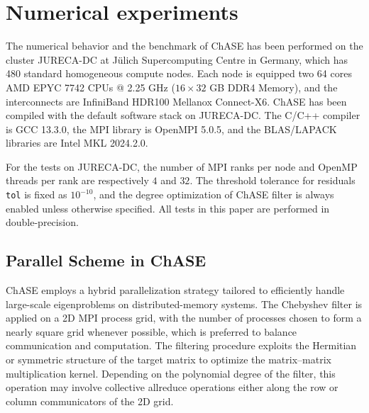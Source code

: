 \section{Numerical experiments}
\label{sec-4}

The numerical behavior and the benchmark of ChASE has been performed on the cluster JURECA-DC  at J\"ulich Supercomputing Centre in Germany, which has 480 standard homogeneous compute nodes. Each node is equipped two 64 cores AMD EPYC 7742 CPUs @ 2.25 GHz ($16 \times 32$ GB DDR4 Memory), and the interconnects are InfiniBand HDR100 Mellanox Connect-X6. ChASE has been compiled with the default software stack on JURECA-DC.
The C/C++ compiler is GCC 13.3.0, the MPI library is OpenMPI 5.0.5, and the BLAS/LAPACK libraries are Intel MKL 2024.2.0. 

For the tests on JURECA-DC, the number of MPI ranks per node and OpenMP threads per rank are respectively $4$ and $32$. The threshold tolerance for residuals {\tt tol} is fixed as $10^{-10}$, and the degree optimization of ChASE filter is always enabled unless otherwise specified. All tests in this paper are performed in double-precision.

\subsection{Parallel Scheme in ChASE}

ChASE employs a hybrid parallelization strategy tailored to efficiently handle large-scale eigenproblems on distributed-memory systems. The Chebyshev filter is applied on a 2D MPI process grid, with the number of processes chosen to form a nearly square grid whenever possible, which is preferred to balance communication and computation. The filtering procedure exploits the Hermitian or symmetric structure of the target matrix to optimize the matrix–matrix multiplication kernel. Depending on the polynomial degree of the filter, this operation may involve collective allreduce operations either along the row or column communicators of the 2D grid.

